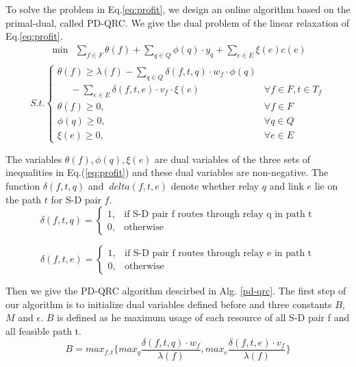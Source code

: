 To solve the problem in Eq.\ref{eq:profit}, we design an online algorithm based on the primal-dual, called PD-QRC. We give the dual problem of the linear relaxation of Eq.\ref{eq:profit}.
	\begin{equation*}
    \begin{aligned}
    \min \ \ \sum_{f \in F}\theta(f) + \sum_{q \in Q}\phi(q) \cdot y_q + \sum_{e \in E}\xi(e)c(e) \\
    \end{aligned}
	\end{equation*}
	\begin{equation}\label{eq:dual_profit}
	S.t.\begin{cases}
     \theta(f) \ge  \lambda(f) - \sum_{q \in Q}\delta(f,t,q) \cdot w_f \cdot \phi(q) \\
     \ \ \ \ \ \ -  \sum_{e \in E}\delta(f,t,e) \cdot v_f \cdot \xi(e) & \forall f \in F, t \in T_f \\
     \theta(f)  \ge 0, & \forall f \in F \\
     \phi(q)  \ge 0, & \forall q \in Q \\
     \xi(e) \ge 0, & \forall e \in E


	\end{cases}
	\end{equation}

The variables $\theta(f),\phi(q),\xi(e)$ are dual variables of the three sets of inequalities in Eq.(\ref{eq:profit}) and these dual variables are non-negative. The function $\delta(f,t,q)$ and $\
delta(f,t,e)$ denote whether relay $q$ and link $e$ lie on the path $t$ for S-D pair $f$.
\begin{equation*}
    \delta(f,t,q)=\begin{cases}
      1, & \mbox{if S-D pair f routes through relay q in path t}\\
      0, & \mbox{otherwise}
    \end{cases}
\end{equation*}

\begin{equation*}
    \delta(f,t,e)=\begin{cases}
      1, & \mbox{if S-D pair f routes through relay e in path t}\\
      0, & \mbox{otherwise}
    \end{cases}
\end{equation*}

Then we give the PD-QRC algorithm descirbed in Alg. \ref{pd-qrc}. The first step of our algorithm is to initialize dual variables defined before and three constants $B$,$M$ and $\epsilon$. $B$ is defined as he maximum usage of each resource of all S-D pair f and all feasible path t.
\begin{equation}
    B = max_{f,t}\{max_q \frac{\delta(f,t,q) \cdot w_f}{\lambda(f)},max_e \frac{\delta(f,t,e) \cdot v_f}{\lambda(f)} \}
\end{equation}


